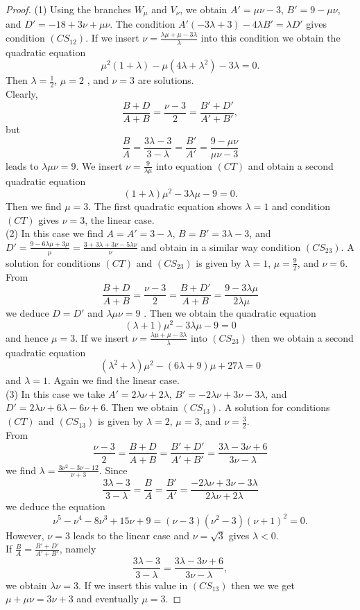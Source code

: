 \documentclass[12pt]{article}
\begin{document}
\begin{proof}
(1) Using the branches 	$W_{\mu}$ and $V_{\nu}$, we obtain $A'= \mu \nu -3$, $B' = 9 -\mu \nu$, and $D'= -18 + 3 \nu + \mu \nu$. The condition $A'(-3\lambda +3) - 4\lambda B' = \lambda D'$ gives condition $(CS_{12})$. If we insert $\nu = \frac{\lambda \mu + \mu - 3 \lambda}{\lambda}$ into this condition we obtain the quadratic equation 
$$\mu^2 (1+ \lambda) - \mu(4 \lambda + \lambda^2) - 3\lambda  =0.$$
Then  $\lambda = \frac{1}{2} $, $\mu = 2$ , and $\nu =3$ are solutions.\\
Clearly, $$\frac{B+D}{A+B} = \frac{\nu -3}{2}= \frac{B'+D'}{A'+B'},$$  but $$\frac{B}{A} = \frac{3\lambda -3}{3 -\lambda} =  \frac{B'}{A'} = \frac{9 - \mu \nu}{\mu \nu -3}$$ leads to $\lambda \mu \nu = 9$. We insert $\nu = \frac{9}{\lambda \mu }$ into equation $(CT)$ and obtain a second quadratic  equation
$$(1+ \lambda)\mu^2  -3 \lambda \mu - 9  =0.$$ Then we find $\mu = 3$. The first quadratic equation shows $\lambda =1$ and condition $(CT)$ gives $\nu =3$, the linear case.\\
(2) In this case we find $A = A' = 3 -\lambda$, $B=B' = 3 \lambda  -3$, and $D' = \frac{9-6\lambda \mu + 3 \mu }{\mu} = 
\frac{3 + 3 \lambda + 3 \nu -5 \lambda \nu}{\nu}$ and obtain in a similar way condition $(CS_{23})$. A solution for conditions $(CT)$ and $(CS_{23})$ is given by $\lambda =1$, $\mu = \frac{9}{2}$, and $\nu =6$.\\
From $$\frac{B+D}{A+B} = \frac{\nu -3}{2} = \frac{B+D'}{A+B}= \frac{9-3\lambda \mu}{2 \lambda \mu}$$ we deduce $D=D'$ and $\lambda \mu \nu =9$ .  Then we obtain the quadratic equation
$$(\lambda +1)\mu^2 - 3\lambda \mu - 9 = 0$$ and hence $\mu =3$.
If we insert $\nu = \frac{\lambda \mu + \mu - 3 \lambda}{\lambda}$ into $(CS_{23})$ then we obtain a second quadratic equation
$$ (\lambda^2 + \lambda)\mu^2 - (6 \lambda +9)\mu  +27 \lambda =0$$ and $\lambda =1$.
 Again we find the linear case.\\
(3) In this case we take $A' = 2 \lambda \nu + 2 \lambda$, $B' = -2 \lambda \nu + 3 \nu - 3 \lambda$, and $D' = 2 \lambda \nu + 6 \lambda - 6 \nu +6$. Then we obtain $(CS_{13})$.  A solution for conditions $(CT)$ and $(CS_{13})$ is given by $\lambda =2$, $\mu = 3$, and $\nu = \frac{3}{2}$.\\
 From  $$ \frac{\nu -3}{2}=\frac{B+D}{A+B}= \frac{B'+D'}{A' +B'} = \frac{3 \lambda - 3 \nu +6}{3 \nu - \lambda}$$ we find $\lambda = \frac{3\nu^2 - 3\nu -12}{\nu +3}$.  Since $$\frac{3 \lambda -3}{3- \lambda} = \frac{B}{A} = \frac{B'}{A'}= \frac{- 2\lambda \nu + 3 \nu - 3 \lambda}{2 \lambda \nu + 2 \lambda }$$ we deduce the equation
$$\nu^5 - \nu^4 -8 \nu^3 + 15\nu +9 = (\nu -3)(\nu^2 -3)(\nu +1)^2=0.$$ However, $\nu =3$ leads to the linear case and $\nu = \sqrt{3}$ gives $\lambda < 0$.\\
If $\frac{B}{A} = \frac{B' +D'}{A'+B'}$, namely $$\frac{3 \lambda -3}{3- \lambda}= \frac{3 \lambda - 3 \nu +6}{3 \nu - \lambda},$$ we obtain $\lambda \nu =3$. If we insert this value in $(CS_{13})$ then we we get $\mu + \mu \nu = 3 \nu +3$ and eventually $\mu = 3$. 
\end{proof}
\end{document}
